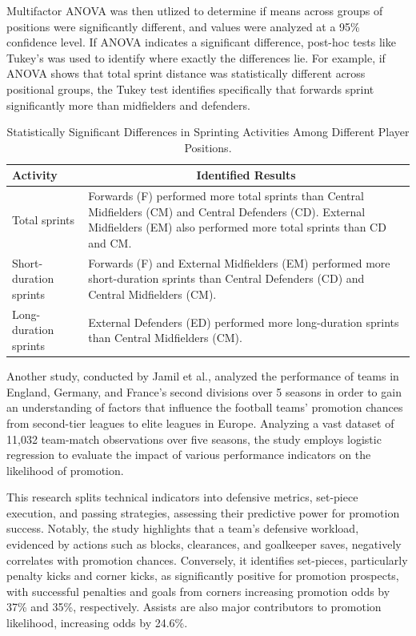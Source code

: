 Multifactor ANOVA was then utlized to determine if means across groups of positions were significantly different, and  values were analyzed at a 95\% confidence level. If ANOVA indicates a significant difference, post-hoc tests like Tukey's was used to identify where exactly the differences lie. For example, if ANOVA shows that total sprint distance was statistically different across positional groups, the Tukey test identifies specifically that forwards sprint significantly more than midfielders and defenders.
\newline
\begin{table}[ht]
\centering
\begin{tabular}{p{}p{}p{}}
\hline
Activity & \multicolumn{2}{c}{Identified Results} \\
\hline
Total sprints & \multicolumn{2}{p{0.6\textwidth}}{Forwards (F) performed more total sprints than Central Midfielders (CM) and Central Defenders (CD). External Midfielders (EM) also performed more total sprints than CD and CM.} \\
Short-duration sprints & \multicolumn{2}{p{0.6\textwidth}}{Forwards (F) and External Midfielders (EM) performed more short-duration sprints than Central Defenders (CD) and Central Midfielders (CM).} \\
Long-duration sprints & \multicolumn{2}{p{0.6\textwidth}}{External Defenders (ED) performed more long-duration sprints than Central Midfielders (CM).} \\
\hline
\end{tabular}
\caption{Statistically Significant Differences in Sprinting Activities Among Different Player Positions.}
\label{tab:sprinting_activities}
\end{table}
\newline
Another study, conducted by Jamil et al., \cite{Jamil2021} analyzed the performance of teams in England, Germany, and France’s second divisions over 5 seasons in order to gain an understanding of factors that influence the football teams' promotion chances from second-tier leagues to elite leagues in Europe. Analyzing a vast dataset of 11,032 team-match observations over five seasons, the study employs logistic regression to evaluate the impact of various performance indicators on the likelihood of promotion.

This research splits technical indicators into defensive metrics, set-piece execution, and passing strategies, assessing their predictive power for promotion success. Notably, the study highlights that a team's defensive workload, evidenced by actions such as blocks, clearances, and goalkeeper saves, negatively correlates with promotion chances. Conversely, it identifies set-pieces, particularly penalty kicks and corner kicks, as significantly positive for promotion prospects, with successful penalties and goals from corners increasing promotion odds by 37\% and 35\%, respectively. Assists are also major contributors to promotion likelihood, increasing odds by 24.6\%. \cite{Jamil2021}



